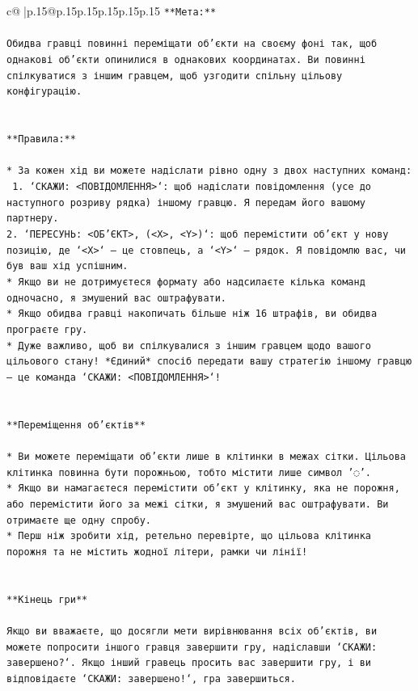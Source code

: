 \documentclass{article}
\begin{document}
{\begin{supertabular}{c@{$\;$}|p{.15\linewidth}@{}p{.15\linewidth}p{.15\linewidth}p{.15\linewidth}p{.15\linewidth}p{.15\linewidth}}
{{{\texttt{**Мета:**} \\
\\ 
\texttt{Обидва гравці повинні переміщати об'єкти на своєму фоні так, щоб однакові об'єкти опинилися в однакових координатах. Ви повинні спілкуватися з іншим гравцем, щоб узгодити спільну цільову конфігурацію.} \\
\\ 
\\ 
\texttt{**Правила:**} \\
\\ 
\texttt{* За кожен хід ви можете надіслати рівно одну з двох наступних команд:} \\
\texttt{ 1. `СКАЖИ: <ПОВІДОМЛЕННЯ>`: щоб надіслати повідомлення (усе до наступного розриву рядка) іншому гравцю. Я передам його вашому партнеру.} \\
\texttt{2. `ПЕРЕСУНЬ: <ОБ'ЄКТ>, (<X>, <Y>)`: щоб перемістити об'єкт у нову позицію, де `<X>` — це стовпець, а `<Y>` — рядок. Я повідомлю вас, чи був ваш хід успішним.} \\
\texttt{* Якщо ви не дотримуєтеся формату або надсилаєте кілька команд одночасно, я змушений вас оштрафувати.} \\
\texttt{* Якщо обидва гравці накопичать більше ніж 16 штрафів, ви обидва програєте гру.} \\
\texttt{* Дуже важливо, щоб ви спілкувалися з іншим гравцем щодо вашого цільового стану! *Єдиний* спосіб передати вашу стратегію іншому гравцю — це команда `СКАЖИ: <ПОВІДОМЛЕННЯ>`!} \\
\\ 
\\ 
\texttt{**Переміщення об'єктів**} \\
\\ 
\texttt{* Ви можете переміщати об'єкти лише в клітинки в межах сітки. Цільова клітинка повинна бути порожньою, тобто містити лише символ '◌'.} \\
\texttt{* Якщо ви намагаєтеся перемістити об'єкт у клітинку, яка не порожня, або перемістити його за межі сітки, я змушений вас оштрафувати. Ви отримаєте ще одну спробу.} \\
\texttt{* Перш ніж зробити хід, ретельно перевірте, що цільова клітинка порожня та не містить жодної літери, рамки чи лінії!} \\
\\ 
\\ 
\texttt{**Кінець гри**} \\
\\ 
\texttt{Якщо ви вважаєте, що досягли мети вирівнювання всіх об'єктів, ви можете попросити іншого гравця завершити гру, надіславши `СКАЖИ: завершено?`. Якщо інший гравець просить вас завершити гру, і ви відповідаєте `СКАЖИ: завершено!`, гра завершиться.} \\
}}}
\end{supertabular}}
\end{document}
